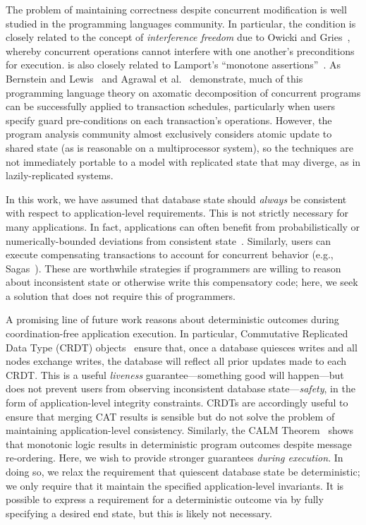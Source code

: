  The problem of maintaining correctness
despite concurrent modification is well studied in the programming
languages community. In particular, the \cfreedom condition is closely
related to the concept of \textit{interference freedom} due to Owicki
and Gries~\cite{owickigries}, whereby concurrent operations cannot
interfere with one another's preconditions for execution. \iconfluence
is also closely related to Lamport's ``monotone
assertions''~\cite{lamport-correctness}. As Bernstein and
Lewis~\cite{decomp-semantics} and Agrawal et
al.~\cite{agarwal-consistency} demonstrate, much of this programming
language theory on axomatic decomposition of concurrent programs can
be successfully applied to transaction schedules, particularly when
users specify guard pre-conditions on each transaction's
operations. However, the program analysis community almost exclusively
considers atomic update to shared state (as is reasonable on a
multiprocessor system), so the techniques are not immediately portable
to a model with replicated state that may diverge, as in
lazily-replicated systems.

 In this work, we have assumed that
database state should \textit{always} be consistent with respect to
application-level requirements. This is not strictly necessary for
many applications. In fact, applications can often benefit from
probabilistically or numerically-bounded deviations from consistent
state~\cite{epsilon-divergence}. Similarly, users can execute
compensating transactions to account for concurrent behavior (e.g.,
Sagas~\cite{sagas}). These are worthwhile strategies if programmers
are willing to reason about inconsistent state or otherwise write this
compensatory code; here, we seek a solution that does not require this
of programmers.

 A promising line of future work
reasons about deterministic outcomes during coordination-free
application execution. In particular, Commutative Replicated Data Type
(CRDT) objects~\cite{crdt} ensure that, once a database quiesces
writes and all nodes exchange writes, the database will reflect all
prior updates made to each CRDT. This is a useful \textit{liveness}
guarantee---something good will happen---but does not prevent users
from observing inconsistent database state---\textit{safety}, in the
form of application-level integrity constraints. CRDTs are accordingly
useful to ensure that merging CAT results is sensible but do not solve
the problem of maintaining application-level consistency. Similarly,
the CALM Theorem~\cite{ameloot-calm,calm} shows that monotonic logic
results in deterministic program outcomes despite message
re-ordering. Here, we wish to provide stronger guarantees
\textit{during execution}. In doing so, we relax the requirement that
quiescent database state be deterministic; we only require that it
maintain the specified application-level invariants. It is possible to
express a requirement for a deterministic outcome via \iconfluence by
fully specifying a desired end state, but this is likely not
necessary.

